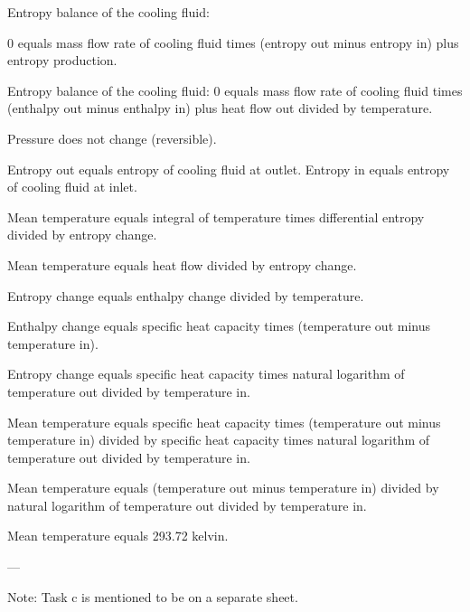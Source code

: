 Entropy balance of the cooling fluid:  

0 equals mass flow rate of cooling fluid times (entropy out minus entropy in) plus entropy production.  

Entropy balance of the cooling fluid:  
0 equals mass flow rate of cooling fluid times (enthalpy out minus enthalpy in) plus heat flow out divided by temperature.  

Pressure does not change (reversible).  

Entropy out equals entropy of cooling fluid at outlet.  
Entropy in equals entropy of cooling fluid at inlet.  

Mean temperature equals integral of temperature times differential entropy divided by entropy change.  

Mean temperature equals heat flow divided by entropy change.  

Entropy change equals enthalpy change divided by temperature.  

Enthalpy change equals specific heat capacity times (temperature out minus temperature in).  

Entropy change equals specific heat capacity times natural logarithm of temperature out divided by temperature in.  

Mean temperature equals specific heat capacity times (temperature out minus temperature in) divided by specific heat capacity times natural logarithm of temperature out divided by temperature in.  

Mean temperature equals (temperature out minus temperature in) divided by natural logarithm of temperature out divided by temperature in.  

Mean temperature equals 293.72 kelvin.  

---

Note: Task c is mentioned to be on a separate sheet.